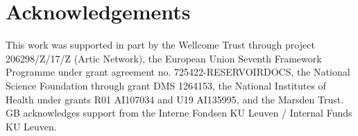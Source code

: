 \documentclass{bioinfo}
\begin{document}



\section*{Acknowledgements}

This work was supported in part by the Wellcome Trust through project 206298/Z/17/Z (Artic Network), the European Union Seventh Framework Programme under grant agreement no. 725422-RESERVOIRDOCS, the National Science Foundation through grant DMS 1264153, the National Institutes of Health under grants R01 AI107034 and U19 AI135995, and the Marsden Trust.
GB acknowledges support from the Interne Fondsen KU Leuven / Internal Funds KU Leuven.




\end{document}

